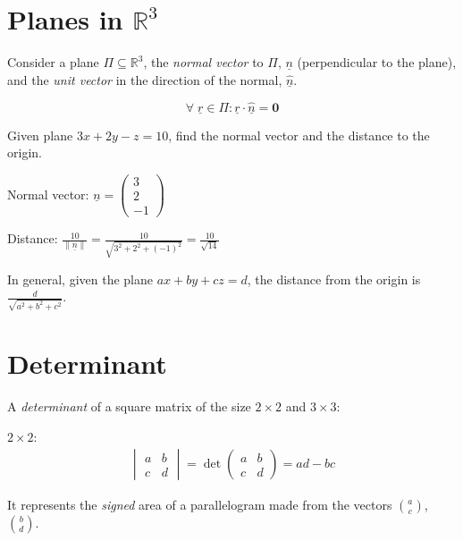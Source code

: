 \documentclass[00_complete]{subfiles}
\begin{document}
\section{Planes in \texorpdfstring{$\mathbb{R}^3$}{R3}}

Consider a plane $\Pi \subseteq \mathbb{R}^3$, the \emph{normal vector} to $\Pi$,
$\underline n$ (perpendicular to the plane), and the \emph{unit vector} in the direction of the normal,
$\underline{\hat n}$.

$$\forall \; \underline r \in \Pi : \underline r \cdot
\underline{\hat n} = \mathbf 0$$

\begin{example}

Given plane $3x+2y-z=10$, find the normal vector and the distance to the
origin.

Normal vector: $\underline n = \begin{pmatrix}
    3\\2\\-1
\end{pmatrix}$

Distance: $\frac{10}{\|\underline n\|} = \frac{10}{\sqrt{3^2+2^2+(-1)^2}} = \frac{10}{\sqrt{14}}$

\end{example}
In general, given the plane $ax+by+cz = d$, the distance from the origin is $\frac{d}{\sqrt{a^2+b^2+c^2}}$.

\section{Determinant}

A \emph{determinant} of a square matrix of the size $2\times2$ and $3\times3$:

$2\times2$:
$$
\begin{gathered}
    \begin{vmatrix}
        a & b \\
        c & d
    \end{vmatrix} = \det \begin{pmatrix}
        a & b \\
        c & d
    \end{pmatrix} = ad - bc
\end{gathered}
$$

It represents the \emph{signed} area of a parallelogram made from the vectors $\binom{a}{c}$,
$\binom{b}{d}$.
\end{document}
